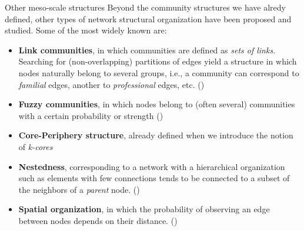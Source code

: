 \begin{textbox}{Other meso-scale structures}
Beyond the community structures we have alredy defined, other types of network structural organization have been proposed and studied. Some of the most widely known are:
\begin{itemize}
    \item \textbf{Link communities}, in which communities are defined as \textit{sets of links}. Searching for (non-overlapping) partitions of edges yield a structure in which nodes naturally belong to several groups, i.e., a community can correspond to \textit{familial} edges, another to \textit{professional} edges, etc. (\cite{ahn2010link})
    \item \textbf{Fuzzy communities}, in which nodes belong to (often several) communities with a certain probability or strength (\cite{liu2010fuzzy})
    \item \textbf{Core-Periphery structure}, already defined when we introduce the notion of \textit{k-cores}
    \item \textbf{Nestedness}, corresponding to a network with a hierarchical organization such as elements with few connections tends to be connected to a subset of the neighbors of a \textit{parent} node. (\cite{pawar2014plant})
    \item \textbf{Spatial organization}, in which the probability of observing an edge between nodes depends on their distance. (\cite{barthelemy2011spatial})
\end{itemize}
\end{textbox}
